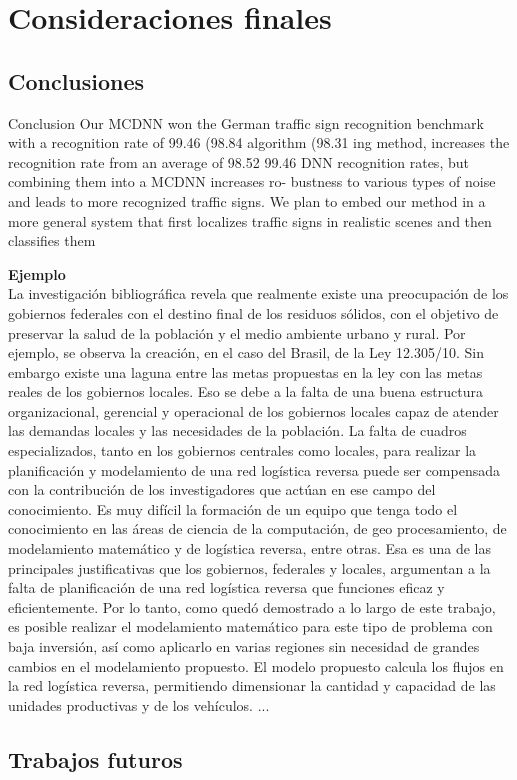 \chapter{Consideraciones finales}
\setcounter{page}{24}
\renewcommand{\baselinestretch}{2} %


\section{Conclusiones}

	Conclusion
	Our MCDNN won the German traffic sign recognition benchmark with
	a  recognition  rate  of  99.46%
	(98.84%
	algorithm  (98.31%
	ing  method,  increases  the  recognition  rate  from  an  average  of  98.52%
	99.46%
	DNN  recognition  rates,  but  combining  them  into  a  MCDNN  increases  ro-
	bustness to various types of noise and leads to more recognized traffic signs.
	We plan to embed our method in a more general system that first localizes
	traffic signs in realistic scenes and then classifies them


	{\bf Ejemplo}\\
	La investigación bibliográfica revela que realmente existe una preocupación de los gobiernos federales con el destino final de los residuos sólidos, con el objetivo de preservar la salud de la población y el medio ambiente urbano y rural. Por ejemplo, se observa la creación, en el caso del Brasil, de la Ley 12.305/10. Sin embargo existe una laguna entre las metas propuestas en la ley con las metas reales de los gobiernos locales. Eso se debe a la falta de una buena estructura organizacional, gerencial y operacional de los gobiernos locales capaz de atender las demandas locales y las necesidades de la población.
	\vskip 0.3cm
	La falta de cuadros especializados, tanto en los gobiernos centrales como locales, para realizar la planificación y modelamiento de una red logística reversa puede ser compensada con la contribución de los investigadores que actúan en ese campo del conocimiento. Es muy difícil la formación de un equipo que tenga todo el conocimiento en las áreas de ciencia de la computación, de geo procesamiento, de modelamiento matemático y de logística reversa, entre otras. Esa es una de las principales justificativas que los gobiernos, federales y locales, argumentan a la falta de planificación de una red logística reversa que funciones eficaz y eficientemente. 
	\vskip 0.3cm
	Por lo tanto, como quedó demostrado a lo largo de este trabajo, es posible realizar el modelamiento matemático para este tipo de problema con baja inversión, así como aplicarlo en varias regiones sin necesidad de grandes cambios en el modelamiento propuesto. El modelo propuesto calcula los flujos en la red logística reversa, permitiendo dimensionar la cantidad y capacidad de las unidades productivas y de los vehículos. 
	\vskip 0.3cm
	...


\section{Trabajos futuros}

